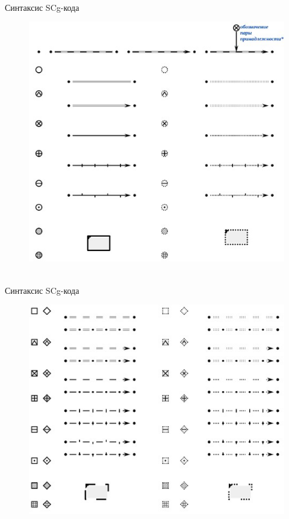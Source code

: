 \begin{frame}{\\Синтаксис SCg-кода}
	\topline
	\justifying
	\vspace*{\fill}
	\begin{figure}[H]
		\includegraphics[scale=0.55]{./figures/external_langs/alphabet_scg_code_part1.png}
	\end{figure}
\end{frame}

\begin{frame}{\\Синтаксис SCg-кода}
	\topline
		\justifying
	\vspace*{\fill}
	\begin{figure}[H]
		\includegraphics[scale=0.6]{./figures/external_langs/alphabet_scg_code_part2.png}
	\end{figure}
\end{frame}

